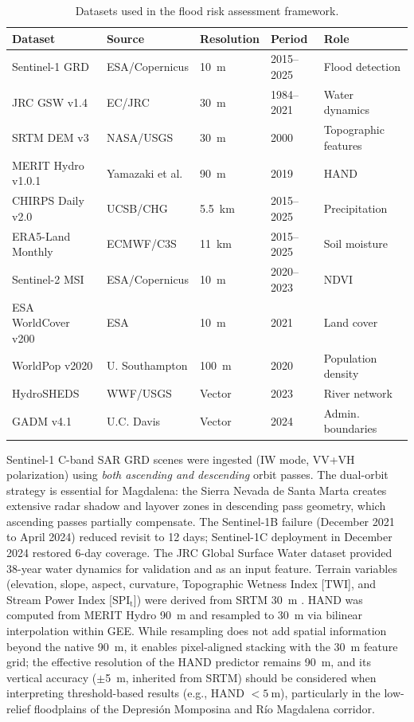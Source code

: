 \documentclass{article}
\begin{document}
\begin{table}[htbp]
\caption{Datasets used in the flood risk assessment framework.}
\label{tab:data_sources}
\centering
\footnotesize
\begin{tabular}{lllll}
\toprule
\textbf{Dataset} & \textbf{Source} & \textbf{Resolution} & \textbf{Period} & \textbf{Role} \\
\midrule
Sentinel-1 GRD & ESA/Copernicus & \SI{10}{\metre} & 2015--2025 & Flood detection \\
JRC GSW v1.4 & EC/JRC & \SI{30}{\metre} & 1984--2021 & Water dynamics \\
SRTM DEM v3 & NASA/USGS & \SI{30}{\metre} & 2000 & Topographic features \\
MERIT Hydro v1.0.1 & Yamazaki et al. & \SI{90}{\metre} & 2019 & HAND \\
CHIRPS Daily v2.0 & UCSB/CHG & \SI{5.5}{\kilo\metre} & 2015--2025 & Precipitation \\
ERA5-Land Monthly & ECMWF/C3S & \SI{11}{\kilo\metre} & 2015--2025 & Soil moisture \\
Sentinel-2 MSI & ESA/Copernicus & \SI{10}{\metre} & 2020--2023 & NDVI \\
ESA WorldCover v200 & ESA & \SI{10}{\metre} & 2021 & Land cover \citep{Zanaga2022} \\
WorldPop v2020 & U. Southampton & \SI{100}{\metre} & 2020 & Population density \citep{Tatem2017} \\
HydroSHEDS & WWF/USGS & Vector & 2023 & River network \citep{Lehner2008} \\
GADM v4.1 & U.C. Davis & Vector & 2024 & Admin. boundaries \\
\bottomrule
\end{tabular}
\end{table}

Sentinel-1 C-band SAR GRD scenes were ingested (IW mode, VV+VH polarization) using \textit{both ascending and descending} orbit passes. The dual-orbit strategy is essential for Magdalena: the Sierra Nevada de Santa Marta creates extensive radar shadow and layover zones in descending pass geometry, which ascending passes partially compensate. The Sentinel-1B failure (December 2021 to April 2024) reduced revisit to 12 days; Sentinel-1C deployment in December 2024 restored 6-day coverage. The JRC Global Surface Water dataset \citep{Pekel2016} provided 38-year water dynamics for validation and as an input feature. Terrain variables (elevation, slope, aspect, curvature, Topographic Wetness Index [TWI], and Stream Power Index [$\text{SPI}_{\text{t}}$]) were derived from SRTM \SI{30}{\metre} \citep{Farr2007}. HAND was computed from MERIT Hydro \SI{90}{\metre} \citep{Yamazaki2019} and resampled to \SI{30}{\metre} via bilinear interpolation within GEE. While resampling does not add spatial information beyond the native \SI{90}{\metre}, it enables pixel-aligned stacking with the \SI{30}{\metre} feature grid; the effective resolution of the HAND predictor remains \SI{90}{\metre}, and its vertical accuracy ($\pm$\SI{5}{\metre}, inherited from SRTM) should be considered when interpreting threshold-based results (e.g., HAND $< \SI{5}{\metre}$), particularly in the low-relief floodplains of the Depresi\'on Momposina and R\'io Magdalena corridor.
\end{document}
